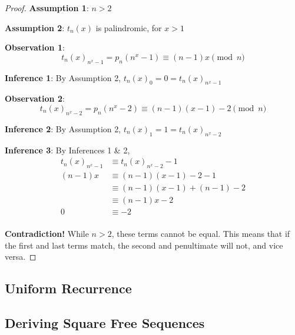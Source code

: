 \documentclass[conference]{IEEEtran}
\begin{document}
\begin{proof}
\par\noindent\par
    \textbf{Assumption 1}: $n > 2$

    \textbf{Assumption 2}: $t_n(x)$ is palindromic, for $x > 1$

    \textbf{Observation 1}: $$t_n(x)_{n^x - 1} = p_n(n^x - 1) \equiv (n - 1)x \pmod{n}$$

    \textbf{Inference 1}: By Assumption 2, $t_n(x)_0 = 0 = t_n(x)_{n^x - 1}$

    \textbf{Observation 2}: $$t_n(x)_{n^x - 2} = p_n(n^x - 2) \equiv (n - 1)(x - 1) - 2 \pmod{n}$$

    \textbf{Inference 2}: By Assumption 2, $t_n(x)_1 = 1 = t_n(x)_{n^x - 2}$

    \textbf{Inference 3}: By Inferences 1 \& 2, \begin{equation}\begin{aligned}
        t_n(x)_{n^x-1} &\equiv t_n(x)_{n^x-2} - 1  \\
        (n - 1)x &\equiv (n - 1)(x - 1) - 2 - 1 \\
                 &\equiv (n - 1)(x - 1) + (n - 1) - 2 \\
                 &\equiv (n - 1)x - 2 \\
               0 &\equiv - 2 \\
    \end{aligned}
    \end{equation}

    \textbf{Contradiction!} While $n > 2$, these terms cannot be equal. This means that if the first and last terms match, the second and penultimate will not, and vice versa.
\end{proof}

\subsection{Uniform Recurrence}


\subsection{Deriving Square Free Sequences}
\end{document}
